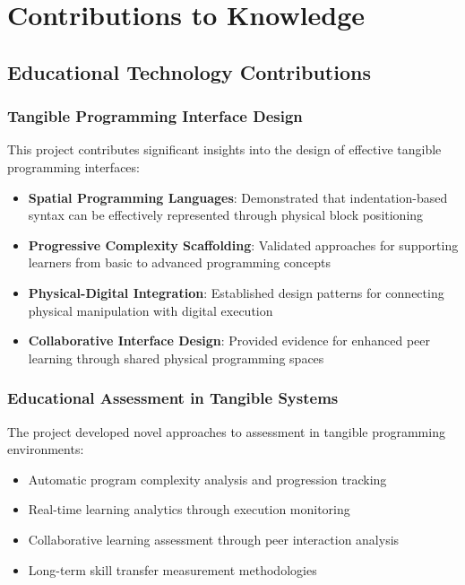 \section{Contributions to Knowledge}

\subsection{Educational Technology Contributions}

\subsubsection{Tangible Programming Interface Design}

This project contributes significant insights into the design of effective tangible programming interfaces:

\begin{itemize}
    \item \textbf{Spatial Programming Languages}: Demonstrated that indentation-based syntax can be effectively represented through physical block positioning
    \item \textbf{Progressive Complexity Scaffolding}: Validated approaches for supporting learners from basic to advanced programming concepts
    \item \textbf{Physical-Digital Integration}: Established design patterns for connecting physical manipulation with digital execution
    \item \textbf{Collaborative Interface Design}: Provided evidence for enhanced peer learning through shared physical programming spaces
\end{itemize}

\subsubsection{Educational Assessment in Tangible Systems}

The project developed novel approaches to assessment in tangible programming environments:

\begin{itemize}
    \item Automatic program complexity analysis and progression tracking
    \item Real-time learning analytics through execution monitoring
    \item Collaborative learning assessment through peer interaction analysis
    \item Long-term skill transfer measurement methodologies
\end{itemize}

